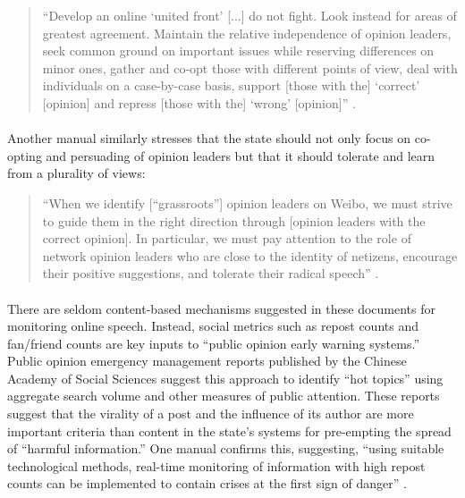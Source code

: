 \documentclass[12pt]{article}
\begin{document}
\begin{CJK*}{UTF8}{gbsn}
\begin{quote}
``Develop an online `united front' [...] do not fight. Look instead for areas of greatest agreement. Maintain the relative independence of opinion leaders, seek common ground on important issues while reserving differences on minor ones, gather and co-opt those with different points of view, deal with individuals on a case-by-case basis, support [those with the] `correct' [opinion] and repress [those with the] `wrong' [opinion]'' \citep[88-89]{zou2015wangluo}.
\end{quote}

\paragraph{} Another manual similarly stresses that the state should not only focus on co-opting and persuading of opinion leaders but that it should tolerate and learn from a plurality of views:

\begin{quote}
``When we identify [``grassroots''] opinion leaders on Weibo, we must strive to guide them in the right direction through [opinion leaders with the correct opinion]. In particular, we must pay attention to the role of network opinion leaders who are close to the identity of netizens, encourage their positive suggestions, and tolerate their radical speech'' \citep[201-228]{zhou2011weibo}.
\end{quote}

\paragraph{} There are seldom content-based mechanisms suggested in these documents for monitoring online speech. Instead, social metrics such as repost counts and fan/friend counts are key inputs to ``public opinion early warning systems.'' Public opinion emergency management reports published by the Chinese Academy of Social Sciences suggest this approach to identify ``hot topics'' using aggregate search volume and other measures of public attention. These reports suggest that the virality of a post and the influence of its author are more important criteria than content in the state's systems for pre-empting the spread of ``harmful information.'' One manual confirms this, suggesting, ``using suitable technological methods, real-time monitoring of information with high repost counts can be implemented to contain crises at the first sign of danger'' \citep[201-228]{zhou2011weibo}.


\end{CJK*}
\end{document}
